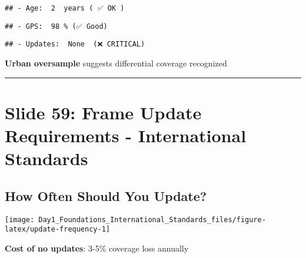 \documentclass[
]{article}
\newenvironment{Shaded}{\begin{snugshade}}{\end{snugshade}}
\newcommand{\FunctionTok}[1]{\textcolor[rgb]{0.13,0.29,0.53}{\textbf{#1}}}
\newcommand{\NormalTok}[1]{#1}
\newcommand{\SpecialCharTok}[1]{\textcolor[rgb]{0.81,0.36,0.00}{\textbf{#1}}}
\newcommand{\StringTok}[1]{\textcolor[rgb]{0.31,0.60,0.02}{#1}}
\begin{document}
\begin{verbatim}
## - Age:  2  years ( ✅ OK )
\end{verbatim}

\begin{Shaded}
\end{Shaded}

\begin{verbatim}
## - GPS:  98 % (✅ Good)
\end{verbatim}

\begin{Shaded}
\end{Shaded}

\begin{verbatim}
## - Updates:  None  (❌ CRITICAL)
\end{verbatim}

\textbf{Urban oversample} suggests differential coverage recognized

\begin{center}\rule{0.5\linewidth}{0.5pt}\end{center}

\section{Slide 59: Frame Update Requirements - International
Standards}\label{slide-59-frame-update-requirements---international-standards}

\subsection{How Often Should You
Update?}\label{how-often-should-you-update}

\texttt{[image: Day1\_Foundations\_International\_Standards\_files/figure-latex/update-frequency-1]}

\textbf{Cost of no updates}: 3-5\% coverage loss annually
\end{document}
